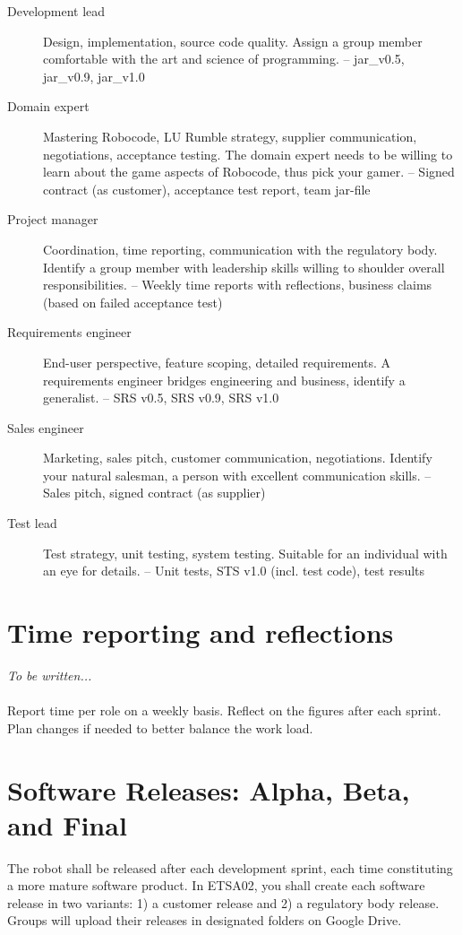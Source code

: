 \documentclass{scrreprt}
\begin{document}
\begin{description}
\item[Development lead] Design, implementation, source code quality. Assign a group member comfortable with the art and science of programming. -- jar_v0.5, jar_v0.9, jar_v1.0
\item[Domain expert] Mastering Robocode, LU Rumble strategy, supplier communication, negotiations, acceptance testing. The domain expert needs to be willing to learn about the game aspects of Robocode, thus pick your gamer. -- Signed contract (as customer), acceptance test report, team jar-file
\item[Project manager] Coordination, time reporting, communication with the regulatory body. Identify a group member with leadership skills willing to shoulder overall responsibilities. -- Weekly time reports with reflections, business claims (based on failed acceptance test)
\item[Requirements engineer] End-user perspective, feature scoping, detailed requirements. A requirements engineer bridges engineering and business, identify a generalist. -- SRS v0.5, SRS v0.9, SRS v1.0
\item[Sales engineer] Marketing, sales pitch, customer communication, negotiations. Identify your natural salesman, a person with excellent communication skills. -- Sales pitch, signed contract (as supplier)
\item[Test lead] Test strategy, unit testing, system testing. Suitable for an individual with an eye for details. -- Unit tests, STS v1.0 (incl. test code), test results
\end{description}

\section{Time reporting and reflections} \label{sec:time}
\emph{To be written...}\\\\
Report time per role on a weekly basis. Reflect on the figures after each sprint. Plan changes if needed to better balance the work load.

\section{Software Releases: Alpha, Beta, and Final}
The robot shall be released after each development sprint, each time constituting a more mature software product. In ETSA02, you shall create each software release in two variants: 1) a customer release and 2) a regulatory body release. Groups will upload their releases in designated folders on Google Drive.
\end{document}
